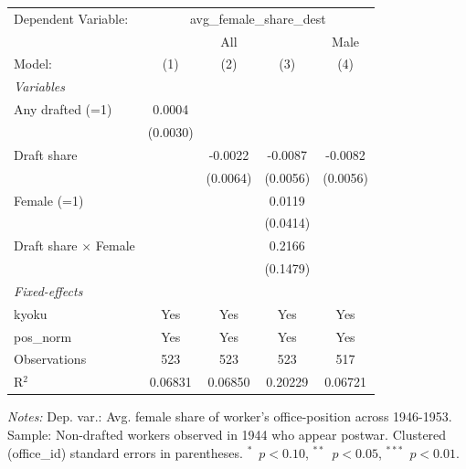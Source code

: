 \begin{table}[htbp]
\begin{threeparttable}
\begingroup
\centering
\begin{tabular}{lcccc}
   \tabularnewline \midrule \midrule
   Dependent Variable: & \multicolumn{4}{c}{avg\_female\_share\_dest}\\
    & \multicolumn{3}{c}{All} & Male \\ 
   Model:                       & (1)      & (2)      & (3)      & (4)\\  
   \midrule
   \emph{Variables}\\
   Any drafted (=1)             & 0.0004   &          &          &   \\   
                                & (0.0030) &          &          &   \\   
   Draft share                  &          & -0.0022  & -0.0087  & -0.0082\\   
                                &          & (0.0064) & (0.0056) & (0.0056)\\   
   Female (=1)                  &          &          & 0.0119   &   \\   
                                &          &          & (0.0414) &   \\   
   Draft share $\times$ Female  &          &          & 0.2166   &   \\   
                                &          &          & (0.1479) &   \\   
   \midrule
   \emph{Fixed-effects}\\
   kyoku                        & Yes      & Yes      & Yes      & Yes\\  
   pos\_norm                    & Yes      & Yes      & Yes      & Yes\\  
   \midrule
   Observations                 & 523      & 523      & 523      & 517\\  
   R$^2$                        & 0.06831  & 0.06850  & 0.20229  & 0.06721\\  
   \midrule \midrule
\end{tabular}
\par\endgroup
\begin{tablenotes}[flushleft]
\footnotesize
\item \textit{Notes:} Dep. var.: Avg. female share of worker's office-position across 1946-1953. Sample: Non-drafted workers observed in 1944 who appear postwar. Clustered (office\_id) standard errors in parentheses. $^{*}$~$p<0.10$, $^{**}$~$p<0.05$, $^{***}$~$p<0.01$.
\end{tablenotes}
\end{threeparttable}
\end{table}
